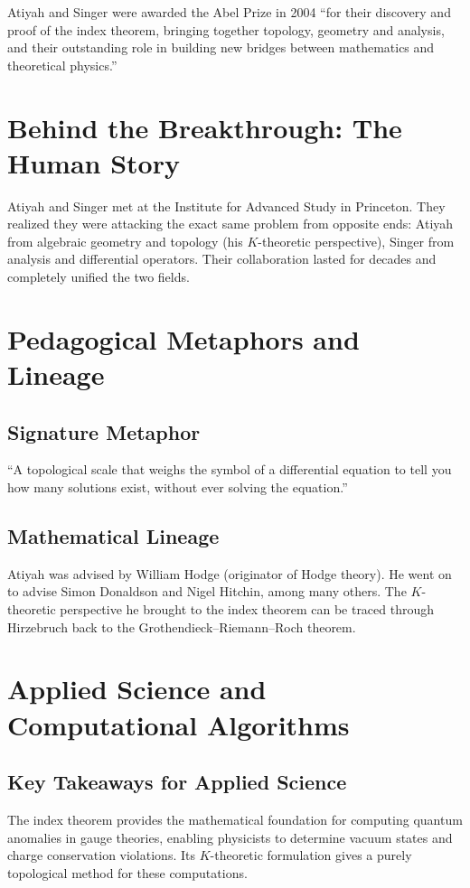 Atiyah and Singer were awarded the Abel Prize in 2004 ``for their discovery and proof of the index theorem, bringing together topology, geometry and analysis, and their outstanding role in building new bridges between mathematics and theoretical physics.''


\section{Behind the Breakthrough: The Human Story}
Atiyah and Singer met at the Institute for Advanced Study in Princeton. They realized they were attacking the exact same problem from opposite ends: Atiyah from algebraic geometry and topology (his $K$-theoretic perspective), Singer from analysis and differential operators. Their collaboration lasted for decades and completely unified the two fields.

\section{Pedagogical Metaphors and Lineage}
\subsection{Signature Metaphor}
``A topological scale that weighs the symbol of a differential equation to tell you how many solutions exist, without ever solving the equation.''

\subsection{Mathematical Lineage}
Atiyah was advised by William Hodge (originator of Hodge theory). He went on to advise Simon Donaldson and Nigel Hitchin, among many others. The $K$-theoretic perspective he brought to the index theorem can be traced through Hirzebruch back to the Grothendieck--Riemann--Roch theorem.

\section{Applied Science and Computational Algorithms}
\subsection{Key Takeaways for Applied Science}
The index theorem provides the mathematical foundation for computing quantum anomalies in gauge theories, enabling physicists to determine vacuum states and charge conservation violations. Its $K$-theoretic formulation gives a purely topological method for these computations.

